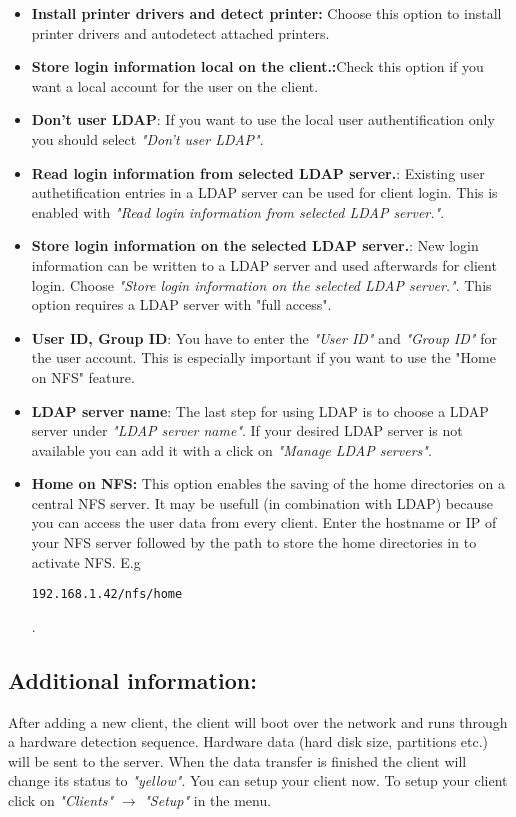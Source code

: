 \begin{itemize}
\item \textbf{Install printer drivers and detect printer:} Choose this option to install printer drivers and autodetect attached printers.\\
\item \textbf{Store login information local on the client.:}Check this option if you want a local account for the user on the client.\\
\item \textbf{Don't user LDAP}: If you want to use the local user authentification only you should select \textit{"Don't user LDAP"}. \\
\item \textbf{Read login information from selected LDAP server.}: Existing user authetification entries in a LDAP server can be used for client login. This is enabled with \textit{"Read login information from selected LDAP server."}.\\
\item \textbf{Store login information on the selected LDAP server.}: New login information can be written to a LDAP server and used afterwards for client login. Choose \textit{"Store login information on the selected LDAP server."}. This option requires a LDAP server with "full access".\\
\item \textbf{User ID, Group ID}: You have to enter the \textit{"User ID"} and \textit{"Group ID"} for the user account. This is especially important if you want to use the "Home on NFS" feature.\\
\item \textbf{LDAP server name}: The last step for using LDAP is to choose a LDAP server under  \textit{"LDAP server name"}. If your desired LDAP server is not available you can add it with a click on \textit{"Manage LDAP servers"}.\\
\item \textbf{Home on NFS:} This option enables the saving of the home directories on a central NFS server. It may be usefull (in combination with LDAP) because you can access the user data from every client. Enter the hostname or IP of your NFS server followed by the path to store the home directories in to activate NFS. E.g \\
\begin{verbatim}
192.168.1.42/nfs/home
\end{verbatim}
.\\
\end{itemize}
\subsection{Additional information:}
After adding a new client, the client will boot over the network and runs through a hardware detection sequence. Hardware data (hard disk size, partitions etc.) will be sent to the server. When the data transfer is finished the client will change its status to \textit{"yellow"}. You can setup your client now. To setup your client click on \textit{"Clients"} $\rightarrow$ \textit{"Setup"} in the menu.\\
